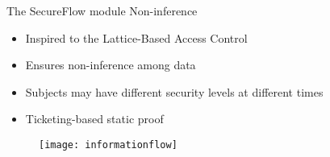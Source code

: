 \begin{frame}{The SecureFlow module \newline Non-inference}
\begin{itemize}
	\item Inspired to the Lattice-Based Access Control
	\item Ensures non-inference among data
	\item Subjects may have different security levels at different times
	\item Ticketing-based static proof
\end{itemize}
\begin{figure}
	\centering\texttt{[image: informationflow]}
\end{figure}
\end{frame}